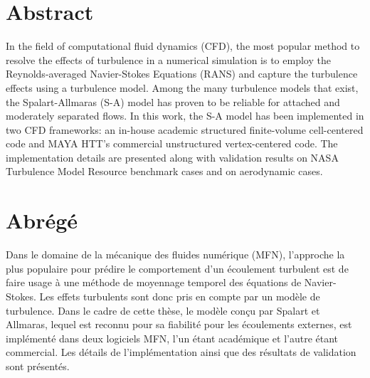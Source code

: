 \chapter*{Abstract}
In the field of computational fluid dynamics (CFD), the most popular
method to resolve the effects of turbulence in a numerical simulation is to
employ the Reynolds-averaged Navier-Stokes Equations (RANS) and
capture the turbulence effects using a turbulence model. Among the many
turbulence models that exist, the Spalart-Allmaras (S-A) model has proven to
be reliable for attached and moderately separated flows. In this work, the S-A model has been implemented in two CFD frameworks: an in-house academic
structured finite-volume cell-centered code and MAYA HTT’s commercial
unstructured vertex-centered code. The implementation details are presented along with validation results on NASA Turbulence Model Resource benchmark cases and on aerodynamic
cases.


\chapter*{Abrégé}
Dans le domaine de la mécanique des fluides numérique (MFN), l'approche la plus populaire pour prédire le comportement d'un écoulement turbulent est de faire usage à une méthode de moyennage temporel des équations de Navier-Stokes. Les effets turbulents sont donc pris en compte par un modèle de turbulence. Dans le cadre de cette thèse, le modèle conçu par Spalart et Allmaras, lequel est reconnu pour sa fiabilité pour les écoulements externes, est implémenté dans deux logiciels MFN, l'un étant académique et l'autre étant commercial. Les détails de l'implémentation ainsi que des résultats de validation sont présentés.
